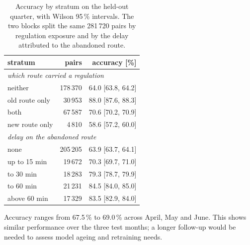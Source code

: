 \documentclass[conference,10pt,a4paper,IEEEoverridecommandlockouts]{IEEEtran}
\begin{document}
\begin{table}[t]
\caption{Accuracy by stratum on the held-out quarter, with Wilson 95\,\%
intervals. The two blocks split the same 281\,720 pairs by regulation
exposure and by the delay attributed to the abandoned route.}
\label{tab:strata}
\centering\footnotesize
\begin{tabular}{lrr}
\toprule
stratum & pairs & accuracy [\%] \\
\midrule
\multicolumn{3}{l}{\emph{which route carried a regulation}} \\
\quad neither          & 178\,370 & 64.0 [63.8, 64.2] \\
\quad old route only   & 30\,953  & 88.0 [87.6, 88.3] \\
\quad both             & 67\,587  & 70.6 [70.2, 70.9] \\
\quad new route only   & 4\,810   & 58.6 [57.2, 60.0] \\
\midrule
\multicolumn{3}{l}{\emph{delay on the abandoned route}} \\
\quad none             & 205\,205 & 63.9 [63.7, 64.1] \\
\quad up to 15 min     & 19\,672  & 70.3 [69.7, 71.0] \\
\quad 15 to 30 min     & 18\,283  & 79.3 [78.7, 79.9] \\
\quad 30 to 60 min     & 21\,231  & 84.5 [84.0, 85.0] \\
\quad above 60 min     & 17\,329  & 83.5 [82.9, 84.0] \\
\bottomrule
\end{tabular}
\end{table}

Accuracy ranges from 67.5\,\% to 69.0\,\% across April, May and June.
This shows similar performance over the three test months; a longer
follow-up would be needed to assess model ageing and retraining needs.
\end{document}
